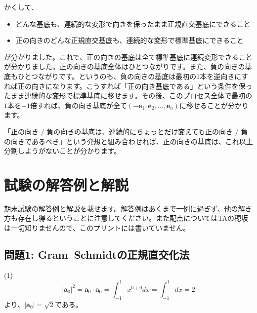 かくして、
\begin{itemize}
\item どんな基底も、連続的な変形で向きを保ったまま正規直交基底にできること
\item 正の向きのどんな正規直交基底も、連続的な変形で標準基底にできること
\end{itemize}
が分かりました。これで、正の向きの基底は全て標準基底に連続変形できることが分かりました。正の向きの基底全体はひとつながりです。また、負の向きの基底もひとつながりです。というのも、負の向きの基底は最初の$1$本を逆向きにすれば正の向きになります。こうすれば「正の向き基底である」という条件を保ったまま連続的な変形で標準基底に移せます。その後、このプロセス全体で最初の$1$本を$-1$倍すれば、負の向き基底が全て$(-\bm{e}_1, \bm{e}_2, \ldots, \bm{e}_n)$に移せることが分かります。

「正の向き / 負の向きの基底は、連続的にちょっとだけ変えても正の向き / 負の向きであるべき」という発想と組み合わせれば、正の向きの基底は、これ以上分割しようがないことが分かります。

\section{試験の解答例と解説}

期末試験の解答例と解説を載せます。解答例はあくまで一例に過ぎず、他の解き方も存在し得るということに注意してください。また配点についてはTAの穂坂は一切知りませんので、このプリントには書いていません。

\subsection{問題1: Gram--Schmidtの正規直交化法}

\noindent (1)
\[
|\bm{a}_0|^2 = \bm{a}_0 \cdot \bm{a}_0 = \int_{-1}^1 x^{0 + 0} dx = \int_{-1}^1 dx = 2
\]
より、$|\bm{a}_0| = \sqrt{2}$である。


